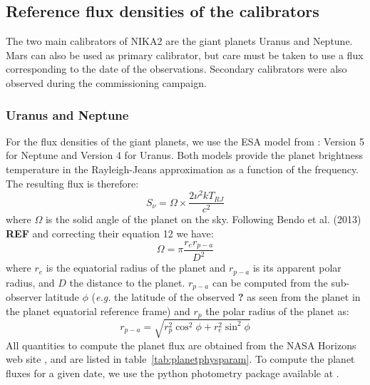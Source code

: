 %
%


\subsection{Reference flux densities of the calibrators}
\label{se:ref_flux}

The two main calibrators of NIKA2 are the giant planets Uranus and
Neptune. Mars can also be used as primary calibrator, but care must be
taken to use a flux corresponding to the date of the
observations. Secondary calibrators were also observed during the
commissioning campaign. 

\subsubsection{Uranus and Neptune}
For the flux densities of the giant planets, we use the ESA model from
\cite{ESAmodel}: Version 5 for Neptune and Version 4 for Uranus. 
Both models provide the planet brightness temperature in the
Rayleigh-Jeans approximation as a function of the frequency. The
resulting flux is therefore: 
\begin{equation}
S_{\nu} = \Omega \times \frac{2 \nu^{2} k T_{RJ}}{c^2}
\end{equation}
where $\Omega$ is the solid angle of the planet on the sky. Following
Bendo et al. (2013) {\bf REF} and correcting their equation 12 we have:
\begin{equation}
\Omega = \pi \frac{r_{e} r_{p-a}}{D^{2}} 
\label{eq:omega}
\end{equation}
where $r_{e}$ is the equatorial radius of the planet and $r_{p-a}$ is
its apparent polar radius, and $D$ the distance to the
planet. $r_{p-a}$ can be computed from the sub-observer latitude $\phi$
({\it e.g.} the latitude of the observed {\bf ?}  as seen from the planet in the
planet equatorial reference frame) and $r_{p}$ the polar radius of the
planet as:
\begin{equation}
r_{p-a} = \sqrt{r_{p}^2 \cos^{2}\phi + r_{e}^2 \sin^{2} \phi}
\end{equation}
All quantities to compute the planet flux are obtained from the NASA
Horizons web site \cite{NASAHorizon}, and are
listed in table~\ref{tab:planetphysparam}. To compute the planet fluxes for a given date, we use the python
photometry package available at \cite{gith-Haussel}.

